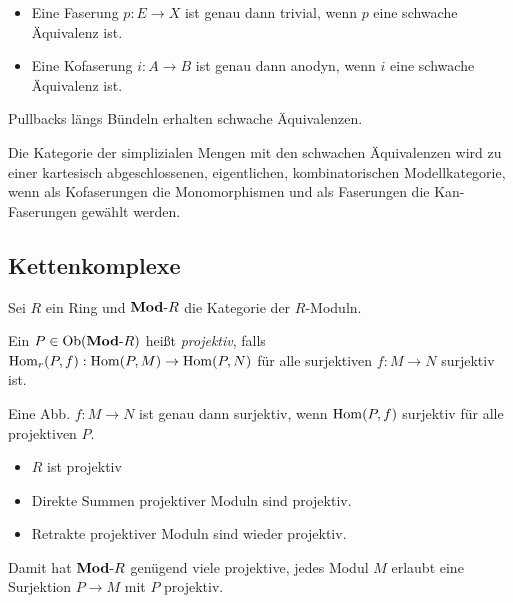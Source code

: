 \documentclass{cheat-sheet}
\begin{document}
\begin{prop}
  \begin{itemize}
    \item Eine Faserung $p : E \to X$ ist genau dann trivial, wenn $p$ eine schwache Äquivalenz ist.
    \item Eine Kofaserung $i : A \to B$ ist genau dann anodyn, wenn $i$ eine schwache Äquivalenz ist.
  \end{itemize}
\end{prop}

\begin{lem}
  Pullbacks längs Bündeln erhalten schwache Äquivalenzen.
\end{lem}

\begin{satz}[Quillen]
  Die Kategorie der simplizialen Mengen mit den schwachen Äquivalenzen wird zu einer kartesisch abgeschlossenen, eigentlichen, kombinatorischen Modellkategorie, wenn als Kofaserungen die Monomorphismen und als Faserungen die Kan-Faserungen gewählt werden.
\end{satz}

\subsection{Kettenkomplexe}

Sei $R$ ein Ring und $\mathbf{Mod}\text{-}{R}$ die Kategorie der $R$-Moduln.

\begin{defn}
  Ein $P \in \operatorname{Ob}(\mathbf{Mod}\text{-}{R})$ heißt \emph{projektiv}, falls $\operatorname{Hom}_r(P, f) : \operatorname{Hom}(P, M) \to \operatorname{Hom}(P, N)$ für alle surjektiven $f : M \to N$ surjektiv ist.
\end{defn}

\begin{bem}
  Eine Abb. $f : M \to N$ ist genau dann surjektiv, wenn $\operatorname{Hom}(P, f)$ surjektiv für alle projektiven $P$.
\end{bem}

\begin{bspe}
  \begin{itemize}
    \item $R$ ist projektiv
    \item Direkte Summen projektiver Moduln sind projektiv.
    \item Retrakte projektiver Moduln sind wieder projektiv.
  \end{itemize}
\end{bspe}

\begin{bem}
  Damit hat $\mathbf{Mod}\text{-}{R}$ genügend viele projektive, \dh{} jedes Modul $M$ erlaubt eine Surjektion $P \to M$ mit $P$ projektiv.
\end{bem}
\end{document}

